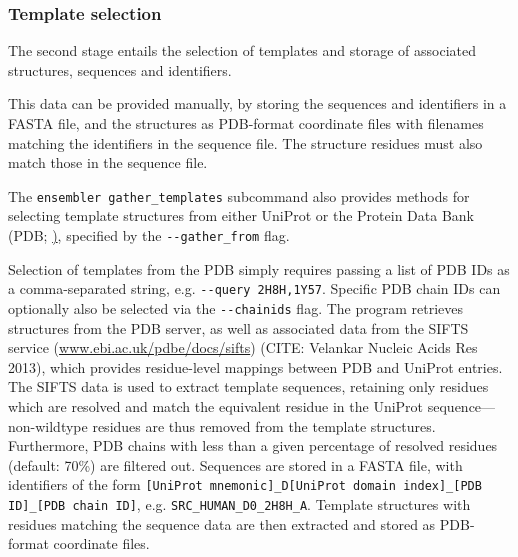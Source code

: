 \documentclass[aps,pre,twocolumn,nofootinbib,superscriptaddress,linenumbers]{revtex4-1}
\begin{document}
\subsubsection{Template selection}

The second stage entails the selection of templates and storage of associated structures, sequences and identifiers.

This data can be provided manually, by storing the sequences and identifiers in a FASTA file, and the structures as PDB-format coordinate files with filenames matching the identifiers in the sequence file.
The structure residues must also match those in the sequence file.

The {\tt ensembler gather\_templates} subcommand also provides methods for selecting template structures from either UniProt or the Protein Data Bank (PDB; \href{http://www.rcsb.org/pdb}), specified by the {\tt -{}-gather\_from} flag.


Selection of templates from the PDB simply requires passing a list of PDB IDs as a comma-separated string, e.g. {\tt -{}-query 2H8H,1Y57}.
Specific PDB chain IDs can optionally also be selected via the {\tt -{}-chainids} flag.
The program retrieves structures from the PDB server, as well as associated data from the SIFTS service (\href{http://www.ebi.ac.uk/pdbe/docs/sifts/}{www.ebi.ac.uk/pdbe/docs/sifts}) (CITE: Velankar Nucleic Acids Res 2013), which provides residue-level mappings between PDB and UniProt entries.
The SIFTS data is used to extract template sequences, retaining only residues which are resolved and match the equivalent residue in the UniProt sequence---non-wildtype residues are thus removed from the template structures.
Furthermore, PDB chains with less than a given percentage of resolved residues (default: 70\%) are filtered out.
Sequences are stored in a FASTA file, with identifiers of the form {\tt [UniProt mnemonic]\_D[UniProt domain index]\_[PDB ID]\_[PDB chain ID]}, e.g. {\tt SRC\_HUMAN\_D0\_2H8H\_A}.
Template structures with residues matching the sequence data are then extracted and stored as PDB-format coordinate files.
\end{document}
